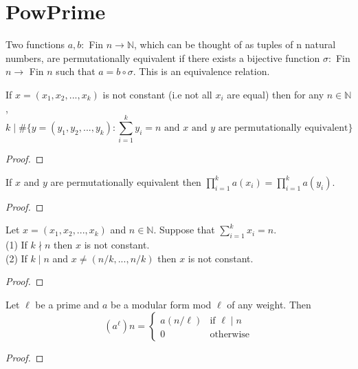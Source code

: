 \section{PowPrime}


\begin{definition} 
  \label{def:perm_equiv}
  \leanok
  Two functions $a, b : $ Fin $n \to \mathbb{N}$, which can be thought of as tuples of n natural numbers,
  are permutationally equivalent if there exists a bijective function $\sigma : $ Fin $n \to $ Fin $n$ such that 
  $a = b \circ \sigma$. This is an equivalence relation. 
\end{definition}

\begin{lemma}
  \label{lem:non_diag_vanish}
  \leanok
  If $x = (x_1, x_2, ..., x_k)$ is not constant (i.e not all $x_i$ are equal) then for any $n \in \mathbb{N}$,
  \[ k \mid \# \{y = (y_1, y_2, ..., y_k) : \sum_{i = 1}^k y_i = n \text{   and $x$ and $y$ are permutationally equivalent} \} \]
\end{lemma}
\begin{proof}
  \leanok
\end{proof}

\begin{lemma}
  \label{lem:Pi_eq_of_perm_equiv}
  \leanok
  If $x$ and $y$ are permutationally equivalent then $\prod_{i = 1}^k a(x_i) = \prod_{i = 1}^k a(y_i)$.
\end{lemma}
\begin{proof}
  \leanok
\end{proof}

\begin{lemma}
  \label{lem:non_const_of_tuple}
  \leanok
  Let $x = (x_1, x_2, ..., x_k)$ and $n \in \mathbb{N}$. Suppose that $\sum_{i = 1}^k x_i = n$. \\
  (1) If $k \nmid n$ then $x$ is not constant. \\
  (2) If $k \mid n$ and $x \neq (n/k, ..., n/k)$ then $x$ is not constant.
\end{lemma}
\begin{proof}
  \leanok
\end{proof}

\begin{theorem} 
  \label{thm:Pow_Prime}
  \leanok
  Let $\ell$ be a prime and $a$ be a modular form mod $\ell$ of any weight. Then \\
  \[(a ^ \ell) n = \begin{cases} a (n / \ell) & \text{if $\ell \mid n$} \\
    0 & \text{otherwise} \end{cases} \]
\end{theorem}
\begin{proof}
  \leanok
\end{proof}



